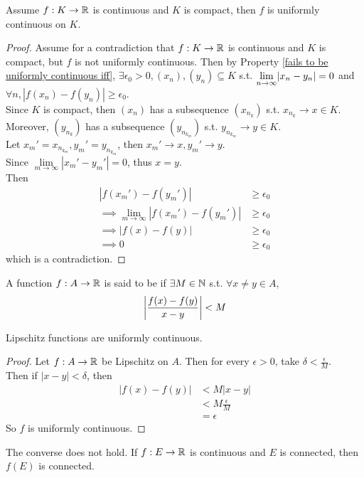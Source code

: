 \documentclass[11pt]{article}
\begin{document}
 Assume $f: K \rightarrow \mathbb{R}$ is continuous and $K$ is compact, then $f$ is uniformly continuous on $K$.
\begin{proof}
	Assume for a contradiction that $f: K \rightarrow \mathbb{R}$ is continuous and $K$ is compact, but $f$ is not uniformly continuous. Then by Property \ref{fails to be uniformly continuous iff}, $\exists \epsilon_0 > 0, (x_n), (y_n) \subseteq K$ s.t. $\underset{n \rightarrow \infty}{\lim} |x_n - y_n| = 0$ and $\forall n, |f(x_n) - f(y_n)| \geq \epsilon_0$. \\ 
	Since $K$ is compact, then $(x_n)$ has a subsequence $(x_{n_k})$ s.t. $x_{n_k} \rightarrow x \in K$.\\
	Moreover, $(y_{n_k})$ has a subsequence $(y_{n_{k_m}})$ s.t. $y_{n_{k_m}} \rightarrow y \in K$.\\
	Let $x_m' = x_{n_{k_m}}, y_m' = y_{n_{k_m}}$, then $x_m' \rightarrow x, y_m' \rightarrow y$.\\
	Since $\underset{m \rightarrow \infty}{\lim} |x_m' - y_m'| = 0$, thus $x = y$.\\
	Then
	\begin{align*}
		|f(x_m') - f(y_m')| & \geq \epsilon_0 \\
		\implies \underset{m \rightarrow \infty}{\lim}|f(x_m') - f(y_m')| & \geq \epsilon_0 \\
		\implies |f(x) - f(y)| &\geq \epsilon_0 \\
		\implies 0 &\geq \epsilon_0
	\end{align*}
	which is a contradiction.
\end{proof}

 A function $f: A \rightarrow \mathbb{R}$ is said to be  if $\exists M \in \mathbb{N}$ s.t. $\forall x \neq y \in A$,
$$\left \vert {\frac{f(x) - f(y)}{x - y}} \right \vert < M$$

\property Lipschitz functions are uniformly continuous.
\begin{proof}
	Let $f: A \rightarrow \mathbb{R}$ be Lipschitz on $A$. Then for every $\epsilon > 0$, take $\delta < \frac{\epsilon}{M}$. \\
	Then if $|x - y| < \delta$, then 
	\begin{align*}
		|f(x) - f(y)| &< M|x - y| \\
		&< M\frac{\epsilon}{M}\\
		&= \epsilon
	\end{align*}
	So $f$ is uniformly continuous.
\end{proof}
\remark
The converse does not hold.
 If $f: E \rightarrow \mathbb{R}$ is continuous and $E$ is connected, then $f(E)$ is connected.
\end{document}
